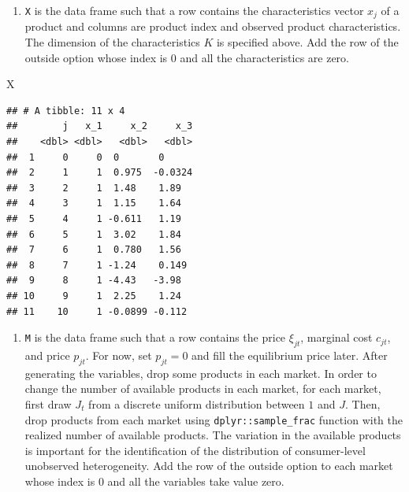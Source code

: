 \documentclass[]{book}
\newenvironment{Shaded}{\begin{snugshade}}{\end{snugshade}}
\newcommand{\NormalTok}[1]{#1}
\providecommand{\tightlist}{%
  \setlength{\itemsep}{0pt}\setlength{\parskip}{0pt}}
\begin{document}
\begin{enumerate}
\def\labelenumi{\arabic{enumi}.}
\setcounter{enumi}{1}
\tightlist
\item
  \texttt{X} is the data frame such that a row contains the
  characteristics vector \(x_{j}\) of a product and columns are product
  index and observed product characteristics. The dimension of the
  characteristics \(K\) is specified above. Add the row of the outside
  option whose index is \(0\) and all the characteristics are zero.
\end{enumerate}

\begin{Shaded}
\begin{Highlighting}[]
\NormalTok{X}
\end{Highlighting}
\end{Shaded}

\begin{verbatim}
## # A tibble: 11 x 4
##        j   x_1     x_2     x_3
##    <dbl> <dbl>   <dbl>   <dbl>
##  1     0     0  0       0     
##  2     1     1  0.975  -0.0324
##  3     2     1  1.48    1.89  
##  4     3     1  1.15    1.64  
##  5     4     1 -0.611   1.19  
##  6     5     1  3.02    1.84  
##  7     6     1  0.780   1.56  
##  8     7     1 -1.24    0.149 
##  9     8     1 -4.43   -3.98  
## 10     9     1  2.25    1.24  
## 11    10     1 -0.0899 -0.112
\end{verbatim}

\begin{enumerate}
\def\labelenumi{\arabic{enumi}.}
\setcounter{enumi}{2}
\tightlist
\item
  \texttt{M} is the data frame such that a row contains the price
  \(\xi_{jt}\), marginal cost \(c_{jt}\), and price \(p_{jt}\). For now,
  set \(p_{jt} = 0\) and fill the equilibrium price later. After
  generating the variables, drop some products in each market. In order
  to change the number of available products in each market, for each
  market, first draw \(J_t\) from a discrete uniform distribution
  between \(1\) and \(J\). Then, drop products from each market using
  \texttt{dplyr::sample\_frac} function with the realized number of
  available products. The variation in the available products is
  important for the identification of the distribution of consumer-level
  unobserved heterogeneity. Add the row of the outside option to each
  market whose index is \(0\) and all the variables take value zero.
\end{enumerate}
\end{document}
